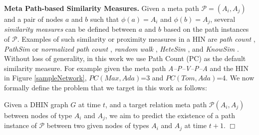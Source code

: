 \textbf{Meta Path-based Similarity Measures.} Given a meta path $\mathcal{P} = (A_i,A_j)$ and a pair of nodes $a$ and $b$ such that $\phi(a)=A_i$ and $\phi(b)=A_{j}$, several \textit{similarity measures} can be defined between $a$ and $b$ based on the path instances of $\mathcal{P}$. Examples of such similarity or proximity measures in a HIN are \textit{path count} \cite{sun2011pathsim,sun2011ASONAM}, \textit{PathSim} \cite{sun2011pathsim} or \textit{normalized path count} \cite{sun2011ASONAM}, \textit{random walk} \cite{sun2011ASONAM}, \textit{HeteSim} \cite{shi2014hetesim}, and \textit{KnowSim} \cite{wang2016text}. 
Without loss of generality, in this work we use Path Count (PC) as the default similarity measure. For example given the meta path \textit{A--P--V--P--A} and the HIN in Figure \ref{sampleNetwork}, $PC(Max,Ada)$=3 and $PC(Tom,Ada)$=4. We now formally define the problem that we target in this work as follows:

\begin{definition}\label{problemdef}Given a DHIN graph $G$ at time $t$, and a target relation meta path $\mathcal{P}(A_i,A_j)$ between nodes of type $A_i$ and $A_j$, we aim to predict the existence of a path instance of $\mathcal{P}$ between two given nodes of types $A_i$ and $A_j$ at time $t+1$. $\Box$ \end{definition}


%



